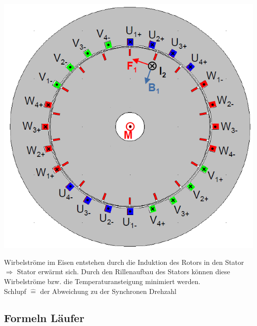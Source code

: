 \begin{multicols}{3}
        \begin{minipage}{\linewidth}
            \includegraphics[width=\linewidth]{images/QuerschnittAmotor}
        \end{minipage}
    \end{multicols}
    Wirbelströme im Eisen entstehen durch die Induktion des Rotors in den Stator \newline
    $\Rightarrow$ Stator erwärmt sich.\newline
    Durch den Rillenaufbau des Stators können diese Wirbelströme bzw. die Temperaturansteigung minimiert werden.
    \\
    Schlupf $\widehat{=}$ der Abweichung zu der Synchronen Drehzahl 
    \clearpage
    \pagebreak

\subsection{Formeln Läufer}


